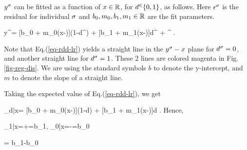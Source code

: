 $y^\sigma$
can be fitted
as a function of $x\in { \mathbb{R}}$,
for $d^\in \{0,1\}$,
 as follows.
Here $\epsilon^\sigma$
is the residual
for individual $\sigma$
and $b_0, m_0, b_1, m_1\in { \mathbb{R}}$
are the fit parameters.

\beq
y^\s = [b_0 + m_0(x-\xi)](1-d^\s)
+  [b_1 + m_1(x-\xi)]d^\s
+ \eps^\s
\;.
\label{eq-rdd-lr}
\eeq

Note that Eq.(\ref{eq-rdd-lr})
 yields a straight line
in the $y^\sigma-x$ plane
for $d^\sigma=0$,
and another 
straight line for $d^\sigma=1$.
These 2 lines are 
colored magenta in Fig.\ref{fig-reg-dis}.
We are
using the
standard symbols
$b$ to denote
the y-intercept, and $m$ 
to denote the slope
of a straight line.

Taking the expected value
of Eq.(\ref{eq-rdd-lr}), we get

\beq
\caly_{d|x}=
[b_0 + m_0(x-\xi)](1-d)
+  [b_1 + m_1(x-\xi)]d
\;.
\eeq
Hence,

\beq
\caly_{1|x=\xi+}=b_1\;,\;\;
\caly_{0|x=\xi-}=b_0
\eeq

\beq
\delta= b_1-b_0
\eeq

